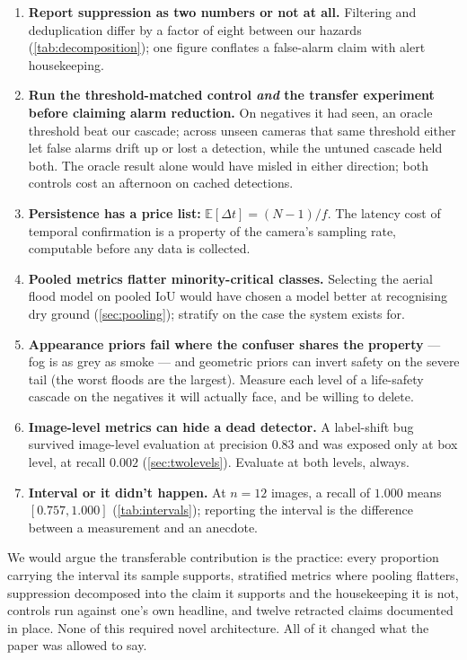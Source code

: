 \begin{enumerate}
  \item \textbf{Report suppression as two numbers or not at all.} Filtering
        and deduplication differ by a factor of eight between our hazards
        (\cref{tab:decomposition}); one figure conflates a false-alarm claim
        with alert housekeeping.
  \item \textbf{Run the threshold-matched control \emph{and} the transfer
        experiment before claiming alarm reduction.} On negatives it had seen,
        an oracle threshold beat our cascade; across unseen cameras that same
        threshold either let false alarms drift up or lost a detection, while
        the untuned cascade held both. The oracle result alone would have
        misled in either direction; both controls cost an afternoon on cached
        detections.
  \item \textbf{Persistence has a price list:}
        $\mathbb{E}[\Delta t] = (N-1)/f$. The latency cost of temporal
        confirmation is a property of the camera's sampling rate, computable
        before any data is collected.
  \item \textbf{Pooled metrics flatter minority-critical classes.} Selecting
        the aerial flood model on pooled IoU would have chosen a model
        better at recognising dry ground (\cref{sec:pooling}); stratify on
        the case the system exists for.
  \item \textbf{Appearance priors fail where the confuser shares the
        property} — fog is as grey as smoke — and geometric priors can
        invert safety on the severe tail (the worst floods are the largest).
        Measure each level of a life-safety cascade on the negatives it will
        actually face, and be willing to delete.
  \item \textbf{Image-level metrics can hide a dead detector.} A label-shift
        bug survived image-level evaluation at precision $0.83$ and was
        exposed only at box level, at recall $0.002$
        (\cref{sec:twolevels}). Evaluate at both levels, always.
  \item \textbf{Interval or it didn't happen.} At $n = 12$ images, a recall
        of $1.000$ means $[0.757, 1.000]$ (\cref{tab:intervals}); reporting
        the interval is the difference between a measurement and an
        anecdote.
\end{enumerate}

We would argue the transferable contribution is the practice: every
proportion carrying the interval its sample supports, stratified metrics
where pooling flatters, suppression decomposed into the claim it supports
and the housekeeping it is not, controls run against one's own headline, and
twelve retracted claims documented in place. None of this required novel
architecture. All of it changed what the paper was allowed to say.


